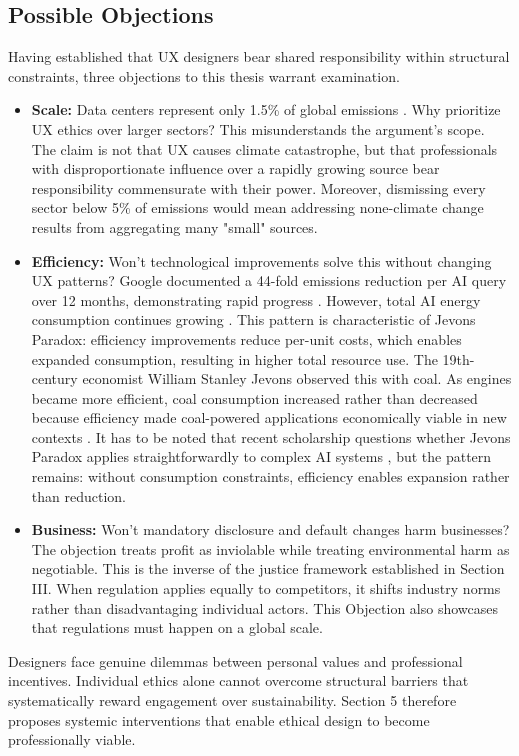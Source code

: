 \subsection{Possible Objections}
Having established that UX designers bear shared responsibility within structural constraints, three objections to this thesis warrant examination.
\begin{itemize}
  \item \textbf{Scale:} Data centers represent only 1.5\% of global emissions \cite{IEA2025EnergyAI}. Why prioritize UX ethics over larger sectors? This misunderstands the argument's scope. The claim is not that UX causes climate catastrophe, but that professionals with disproportionate influence over a rapidly growing source bear responsibility commensurate with their power. Moreover, dismissing every sector below 5\% of emissions would mean addressing none-climate change results from aggregating many "small" sources.

\item \textbf{Efficiency:} Won't technological improvements solve this without changing UX patterns? Google documented a 44-fold emissions reduction per AI query over 12 months, demonstrating rapid progress \cite{google}. However, total AI energy consumption continues growing \cite{IEA2025EnergyAI}. This pattern is characteristic of Jevons Paradox: efficiency improvements reduce
per-unit costs, which enables expanded consumption, resulting in higher total
resource use. The 19th-century economist William Stanley Jevons observed this
with coal. As engines became more efficient, coal consumption increased rather
than decreased because efficiency made coal-powered applications economically
viable in new contexts \cite{ALCOTT20059}. It has to be noted that recent scholarship questions whether Jevons Paradox applies straightforwardly to
complex AI systems \cite{jev}, but the pattern remains: without consumption
constraints, efficiency enables expansion rather than reduction.

  \item \textbf{Business:} Won't mandatory disclosure and default changes harm businesses? The objection treats profit as inviolable while treating environmental harm as negotiable. This is the inverse of the justice framework established in Section III. When regulation applies equally to competitors, it shifts industry norms rather than disadvantaging individual actors. This Objection also showcases that regulations must happen on a global scale.
\end{itemize}

\par Designers face genuine dilemmas between personal values and professional
incentives. Individual ethics alone cannot overcome structural barriers that
systematically reward engagement over sustainability. Section 5 therefore proposes
systemic interventions that enable ethical design to become professionally viable.
